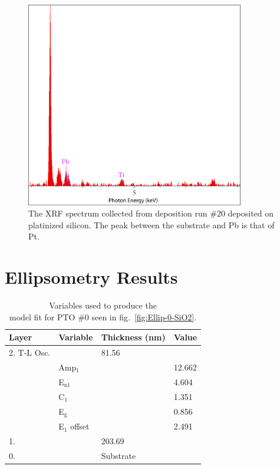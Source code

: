 \begin{figure}[htbp]
	\centering
	\includegraphics[width=0.85\textwidth]{./Figures/Appendix/Composition/PTO-run20-pt.png}
	\caption[XRF Spectrum of PTO \#20 on Pt-Si]%
		     {The XRF spectrum collected from deposition run \#20 deposited on platinized silicon. The peak between the substrate and Pb is that of Pt. }
	\label{fig:XRF-20-Pt}
\end{figure}

\clearpage

\section{Ellipsometry Results}
\label{sup:Ellipsometry}

\begin{table}[htbp]
	\centering
	\caption[PTO \#0 Model Variables]{Variables used to produce the\\model fit for PTO \#0 seen in fig.~\vref{fig:Ellip-0-SiO2}. \label{tbl:PTO-0-ellip-variables}}
	\begin{tabular}{l l l l}
	\toprule
	Layer&Variable&Thickness (nm)&Value\\
	\midrule
	2. T-L Osc.&&81.56&\\
	&Amp$_{1}$&&12.662\\
	&E$_{\mathrm{n1}}$&&4.604\\
	&C$_{1}$&&1.351\\
	&E$_{\mathrm{g}}$&&0.856\\
	&E$_{1}$ offset&&2.491\\
	1. \ce{SiO2}&&203.69&\\
	0. \ce{Si}&&Substrate&\\
	\bottomrule
	\end{tabular}
\end{table}

